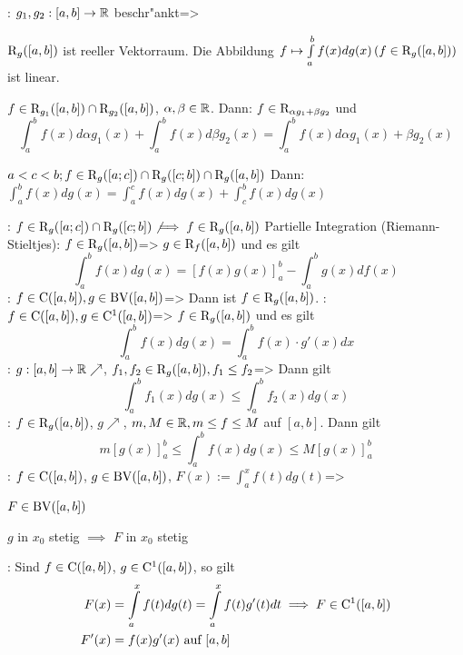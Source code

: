 \theorem:
  $g_1,g_2:[a,b]\to\mathbb R$ beschr"ankt=>{
  \begin{stmts}
    \item ${\rm R}_g([a,b])$ ist reeller Vektorraum.
      Die Abbildung $f\mapsto\int_a^bf(x)dg(x)\,(f\in\SetRInt_g([a,b]))$ ist linear.
    \item $f\in{\rm R}_{g_1}([a,b])\cap{\rm R}_{g_2}([a,b])$, 
      $\alpha,\beta\in\mathbb R$.
      Dann: $f\in{\rm R}_{\alpha g_1+\beta g_2}$ und 
      \[\int_a^b f(x) d\alpha g_1(x)+\int_a^b f(x) d\beta g_2(x)=
	\int_a^b f(x) d\alpha g_1(x)+\beta g_2(x)
        \]
    \item $a<c<b; f\in{\rm R}_g([a;c])\cap {\rm R}_g([c;b])\cap{\rm R}_g([a,b])$ 
      Dann: $\int_a^b f(x)dg(x)=\int_a^c f(x)dg(x)+\int_c^b f(x)dg(x)$
    \end{stmts}
  }
\remark:{
  $f\in{\rm R}_g([a;c])\cap{\rm R}_g([c;b]) \not\implies f\in{\rm R}_g([a,b])$
  }  
\theorem Partielle Integration (Riemann-Stieltjes):
  $f\in{\rm R}_g([a,b])$=>{
    $g\in{\rm R}_f([a,b])$ und es gilt
    \[ \int_a^b f(x)dg(x)= [f(x)g(x)]_a^b-\int_a^b g(x)df(x) \]
  }
\theorem:
  $f\in{\rm C}([a,b]),g\in{\rm BV}([a,b])$=>{
  Dann ist $f\in{\rm R}_g([a,b])$.
  }  
\theorem:
  $f\in{\rm C}([a,b]),g\in{\rm C}^1([a,b])$=>{
  $f\in{\rm R}_g([a,b])$ und es gilt
  \[\int_a^b f(x)dg(x)=\int_a^b f(x)\cdot g'(x)dx 
    \]
  }  
\theorem:
  $g:[a,b]\to\mathbb R \nearrow$, $f_1,f_2\in{\rm R}_g([a,b]), f_1\le f_2$=>
  {
  Dann gilt 
  \[\int_a^b f_1(x)dg(x)\le\int_a^b f_2(x)dg(x)
    \]
  }
\remark:{
  $f\in{\rm R}_g([a,b])$, $g\nearrow$, $m,M\in\mathbb R, m\le f\le M$ auf $[a,b]$.
  Dann gilt
  \[m[g(x)]_a^b\le\int_a^b f(x)dg(x)\le M[g(x)]_a^b
    \]
  }
\theorem:
  $f\in{\rm C}([a,b])$, $g\in{\rm BV}([a,b])$, $F(x):=\int_a^x f(t)dg(t)$=>{
  \begin{stmts}
    \item $F\in{\rm BV}([a,b])$
    \item $g$ in $x_0$ stetig $\implies$ $F$ in $x_0$ stetig
    \end{stmts}
  }
\remark:{
  Sind $f\in{\rm C}([a,b])$, $g\in{\rm C}^1([a,b])$, so gilt
  \begin{align*}
    F(x)&=\int_a^x f(t)dg(t)=\int_a^x f(t)g'(t) dt\implies F\in\SetCont^1([a,b]) \\
    F'(x)&=f(x)g'(x)\text{ auf $[a,b]$}
    \end{align*}
  }
